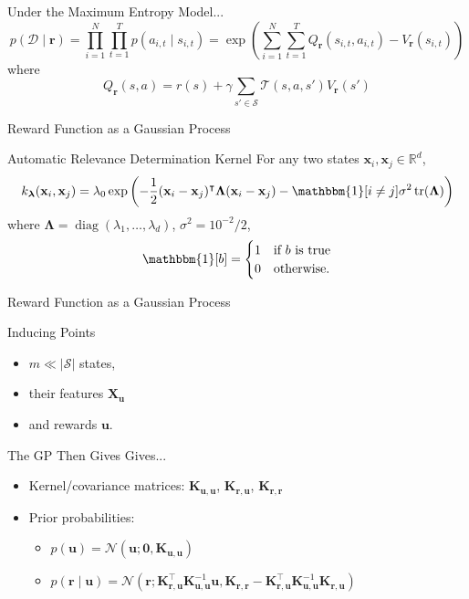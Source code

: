 \documentclass{beamer}
\DeclareMathOperator{\diag}{diag}
\DeclareMathOperator{\tr}{tr}
\newcommand{\Kuu}{\mathbf{K}_{\mathbf{u},\mathbf{u}}}
\newcommand{\Krr}{\mathbf{K}_{\mathbf{r},\mathbf{r}}}
\newcommand{\Kru}{\mathbf{K}_{\mathbf{r},\mathbf{u}}}
\begin{document}
\begin{frame}{Under the Maximum Entropy Model...}
  \[
    p(\mathcal{D} \mid \mathbf{r}) = \prod_{i=1}^N \prod_{t=1}^T p(a_{i,t} \mid
    s_{i,t}) = \exp\left( \sum_{i=1}^N \sum_{t=1}^T Q_{\mathbf{r}}(s_{i,t},
      a_{i,t}) - V_{\mathbf{r}}(s_{i,t}) \right)
  \]
  where
  \[
    Q_{\mathbf{r}}(s, a) = r(s) + \gamma \sum_{s' \in \mathcal{S}}
    \mathcal{T}(s, a, s')V_{\mathbf{r}}(s')
  \]
\end{frame}

\begin{frame}{Reward Function as a Gaussian Process}
  \begin{block}{Automatic Relevance Determination Kernel}
    For any two states $\mathbf{x}_i, \mathbf{x}_j \in \mathbb{R}^d$,
    \[
      k_{\bm\lambda}(\mathbf{x}_i, \mathbf{x}_j) = \lambda_0\exp\left(
        -\frac{1}{2}(\mathbf{x}_i - \mathbf{x}_j)^\intercal\bm\Lambda(\mathbf{x}_i -
        \mathbf{x}_j) - \mathbbm{1}[i \ne j]\sigma^2\tr(\bm\Lambda) \right)
    \]
    where $\bm\Lambda = \diag(\lambda_1, \dots, \lambda_d)$, $\sigma^2 =
    10^{-2}/2$,
    \[
      \mathbbm{1}[b] = \begin{cases}
        1 & \mbox{if $b$ is true} \\
        0 & \mbox{otherwise}.
      \end{cases}
    \]
  \end{block}
\end{frame}

\begin{frame}{Reward Function as a Gaussian Process}
    \begin{block}{Inducing Points}
      \begin{itemize}
      \item $m \ll |\mathcal{S}|$ states,
      \item their features $\mathbf{X_u}$
      \item and rewards $\mathbf{u}$.
      \end{itemize}
    \end{block}

  \begin{block}{The GP Then Gives Gives...}
    \begin{itemize}
    \item Kernel/covariance matrices: $\Kuu$, $\Kru$, $\Krr$
    \item Prior probabilities:
      \begin{itemize}
      \item $p(\mathbf{u}) = \mathcal{N}(\mathbf{u}; \mathbf{0}, \Kuu)$
      \item $p(\mathbf{r} \mid \mathbf{u}) = \mathcal{N}(\mathbf{r};
        \Kru^\intercal\Kuu^{-1}\mathbf{u}, \Krr - \Kru^\intercal\Kuu^{-1}\Kru)$
      \end{itemize}
    \end{itemize}
  \end{block}
\end{frame}
\end{document}
